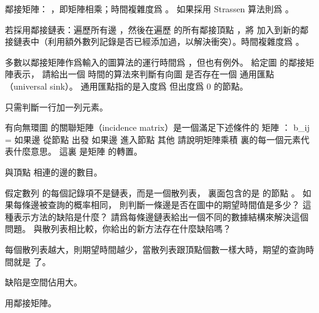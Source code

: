 \startANSWER
鄰接矩陣： ，即矩陣相乘；時間複雜度爲 。
如果採用 Strassen 算法則爲 。

若採用鄰接鏈表：遍歷所有邊 ，然後在遍歷  的所有鄰接頂點 ，將  加入到新的鄰接鏈表中（利用額外數列記錄是否已經添加過，以解決衝突）。時間複雜度爲 。
\stopANSWER

\startEXERCISE
多數以鄰接矩陣作爲輸入的圖算法的運行時間爲 ，但也有例外。
給定圖  的鄰接矩陣表示，
請給出一個  時間的算法來判斷有向圖  是否存在一個 {\EMP 通用匯點}（universal sink）。
通用匯點指的是入度爲  但出度爲 0 的節點。
\stopEXERCISE

\startANSWER
只需判斷一行加一列元素。
\stopANSWER

\startEXERCISE
有向無環圖  的{\EMP 關聯矩陣}（incidence matrix）是一個滿足下述條件的  矩陣 ：
\startformula
b_{ij} = \startcases
{} \NC 如果邊  從節點  出發 \NR
{} \NC 如果邊  進入節點  \NR
{} \NC 其他 \NR
\stopcases
\stopformula
請說明矩陣乘積  裏的每一個元素代表什麼意思。
這裏  是矩陣  的轉置。
\stopEXERCISE

\startANSWER
與頂點  相連的邊的數目。
\stopANSWER

\startEXERCISE
假定數列  的每個記錄項不是鏈表，而是一個散列表，
裏面包含的是  的節點 。
如果每條邊被查詢的概率相同，
則判斷一條邊是否在圖中的期望時間值是多少？
這種表示方法的缺陷是什麼？
請爲每條邊鏈表給出一個不同的數據結構來解決這個問題。
與散列表相比較，你給出的新方法存在什麼缺陷嗎？
\stopEXERCISE

\startANSWER
每個散列表越大，則期望時間越少，當散列表跟頂點個數一樣大時，期望的查詢時間就是  了。

缺陷是空間佔用大。

用鄰接矩陣。
\stopANSWER

\stopsection

